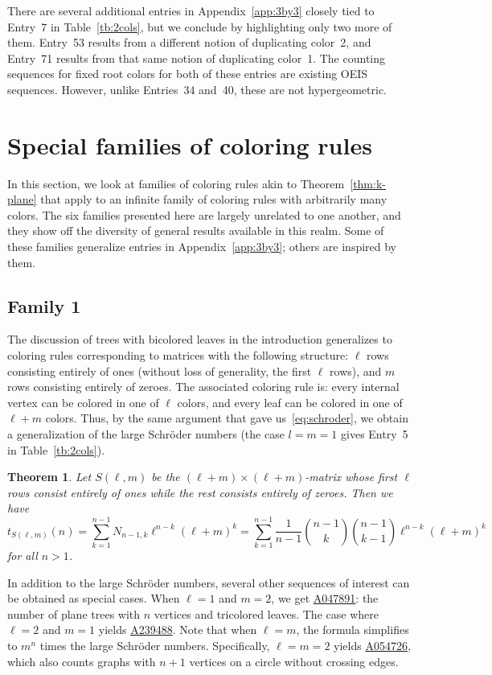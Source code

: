 \documentclass[12pt]{amsart}
\newtheorem{theorem}{Theorem}
\newcommand{\seqnum}[1]{\href{https://oeis.org/#1}{#1}}
\begin{document}
There are several additional entries in Appendix~\ref{app:3by3} closely tied to Entry~7 in Table~\ref{tb:2cols}, but we conclude by highlighting only two more of them. Entry~53 results from a different notion of duplicating color~2, and Entry~71 results from that same notion of duplicating color~1. 
The counting sequences for fixed root colors for both of these entries are existing OEIS sequences. 
However, unlike Entries~34 and~40, these are not hypergeometric.

\section{Special families of coloring rules}\label{sec:special}
In this section, we look at families of coloring rules akin to Theorem~\ref{thm:k-plane} that apply to an infinite family of coloring rules with arbitrarily many colors. The six families presented here are largely unrelated to one another, and they show off the diversity of general results available in this realm. Some of these families generalize entries in Appendix~\ref{app:3by3}; others are inspired by them.



\subsection{Family 1}

The discussion of trees with bicolored leaves in the introduction generalizes to coloring rules corresponding to matrices with the following structure: $\ell$ rows consisting entirely of ones (without loss of generality, the first $\ell$ rows), and $m$ rows consisting entirely of zeroes. The associated coloring rule is: every internal vertex can be colored in one of $\ell$ colors, and every leaf can be colored in one of $\ell+m$ colors. Thus, by the same argument that gave us~\eqref{eq:schroder}, we obtain a generalization of the large Schr\"oder numbers (the case $l=m=1$ gives Entry~5 in Table~\ref{tb:2cols}).

\begin{theorem}\label{thm:gennarayana}
    Let $S(\ell,m)$ be the $(\ell+m) \times (\ell+m)$-matrix whose first $\ell$ rows consist entirely of ones while the rest consists entirely of zeroes. Then we have
    $$t_{S(\ell,m)}(n) = \sum_{k=1}^{n-1} N_{n-1,k} \ell^{n-k} (\ell+m)^k = \sum_{k=1}^{n-1} \frac{1}{n-1} \binom{n-1}{k} \binom{n-1}{k-1} \ell^{n-k} (\ell+m)^k$$
    for all $n > 1$.
\end{theorem}
In addition to the large Schr\"oder numbers, several other sequences of interest can be obtained as special cases. When $
\ell=1$ and $m=2$, we get \seqnum{A047891}: the number of plane trees with $n$ vertices and tricolored leaves. The case where $\ell=2$ and $m=1$ yields \seqnum{A239488}.
Note that when $\ell = m$, the formula simplifies to $m^n$ times the large Schr\"oder numbers. Specifically, $\ell=m=2$ yields \seqnum{A054726}, which also counts graphs with $n+1$ vertices on a circle without crossing edges.
\end{document}
